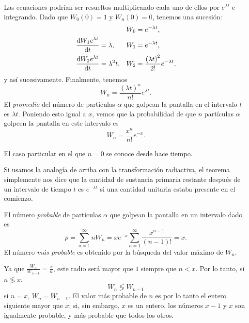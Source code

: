 Las ecuaciones podrían ser resueltos multiplicando cada uno de ellos por $e^{\lambda t}$ e integrando. Dado que $W_0(0)=1$ y $W_n(0)=0$, tenemos una sucesión:
\begin{align*}
	&& W_0&= e^{-\lambda t},\\
	\diff{W_1e^{\lambda t}}{t}&=\lambda, & W_1&= e^{-\lambda t},\\
	\diff{W_2e^{\lambda t}}{t}&=\lambda^2t, & W_2&=\frac{{\left(\lambda t\right)}^2}{2!}e^{-\lambda t},\\
\end{align*}
y así sucesivamente. Finalmente, tenemos
\begin{equation*}
	W_n=\frac{{\left(\lambda t\right)}^n}{n!}e^{\lambda t}.
\end{equation*}
El \emph{promedio} del número de  partículas $\alpha$ que golpean la pantalla en el intervalo $t$ es $\lambda t$. Poniendo esto igual a $x$, vemos que la probabilidad de que $n$ partículas $\alpha$ golpeen la pantalla en este intervalo es
\begin{equation*}
	W_n=\frac{x^n}{n!}e^{-x}.
\end{equation*}

El caso particular en el que $n=0$ se conoce desde hace tiempo. %

Si usamos la analogía de arriba con la transformación radiactiva, el teorema simplemente nos dice que la cantidad de sustancia primaria restante después de un intervalo de tiempo $t$ es $e^{-\lambda t}$ si una cantidad unitaria estaba presente en el comienzo.

El número \emph{probable} de partículas $\alpha$ que golpean la pantalla en un intervalo dado es
\begin{equation*}
	p=\sum_{n=1}^{\infty}nW_n=xe^{-x}\sum_{n=1}^{\infty}\frac{x^{n-1}}{\left(n-1\right)!}=x.
\end{equation*}
El número \emph{más probable} es obtenido por la búsqueda del valor máximo de $W_n$.

Ya que $\frac{W_n}{W_{n-1}}=\frac{x}{n}$, este radio será mayor que $1$ siempre que $n<x$. Por lo tanto, si $n\lessgtr x$, %
\begin{equation*}
	W_n\lessgtr W_{n-1}%
\end{equation*}
si $n=x$, $W_n=W_{n-1}$. El valor más probable de $n$ es por lo tanto el entero siguiente mayor que $x$; si, sin embargo, $x$ es un entero, los números $x-1$ y $x$ son igualmente probable, y más probable que todos los otros.


